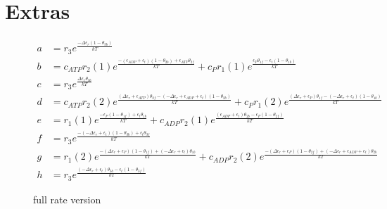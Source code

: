 \documentclass[11pt]{article}
\begin{document}
\section{Extras}
\begin{figure}[H]
    \begin{align}
        a &= r_3 e^{\frac{ - \Delta\epsilon_{r} \left( 1 - \theta_{3b} \right)}{kT}} \\
        b &= c_{ATP} r_{2}(1) e^{\frac{ - \left( {\epsilon}_{ADP} + \epsilon_{t} \right) \left( 1 - \theta_{2b} \right) + {\epsilon}_{ATP} \theta_{2f}}{kT}} + c_P r_{1}(1) e^{\frac{{\epsilon}_P \theta_{1f} - \epsilon_{t} \left( 1 - \theta_{1b} \right)}{kT}} \\
        c &= r_3 e^{\frac{\Delta\epsilon_{r} \theta_{3b}}{kT}} \\
        d &= c_{ATP} r_{2}(2) e^{\frac{\left( \Delta\epsilon_{r} + {\epsilon}_{ATP} \right) \theta_{2f} - \left(  - \Delta\epsilon_{r} + {\epsilon}_{ADP} + \epsilon_{t} \right) \left( 1 - \theta_{2b} \right)}{kT}} + c_P r_{1}(2) e^{\frac{\left( \Delta\epsilon_{r} + {\epsilon}_P \right) \theta_{1f} - \left(  - \Delta\epsilon_{r} + \epsilon_{t} \right) \left( 1 - \theta_{1b} \right)}{kT}} \\
        e &= r_{1}(1) e^{\frac{ - {\epsilon}_P \left( 1 - \theta_{1f} \right) + \epsilon_{t} \theta_{1b}}{kT}} + c_{ADP} r_{2}(1) e^{\frac{\left( {\epsilon}_{ADP} + \epsilon_{t} \right) \theta_{2b} - {\epsilon}_P \left( 1 - \theta_{2f} \right)}{kT}} \\
        f &= r_3 e^{\frac{ - \left(  - \Delta\epsilon_{r} + \epsilon_{t} \right) \left( 1 - \theta_{3b} \right) + \epsilon_{t} \theta_{3f}}{kT}} \\
        g &= r_{1}(2) e^{\frac{ - \left( \Delta\epsilon_{r} + {\epsilon}_P \right) \left( 1 - \theta_{1f} \right) + \left(  - \Delta\epsilon_{r} + \epsilon_{t} \right) \theta_{1b}}{kT}} + c_{ADP} r_{2}(2) e^{\frac{ - \left( \Delta\epsilon_{r} + {\epsilon}_P \right) \left( 1 - \theta_{2f} \right) + \left(  - \Delta\epsilon_{r} + {\epsilon}_{ADP} + \epsilon_{t} \right) \theta_{2b}}{kT}} \\
        h &= r_3 e^{\frac{\left(  - \Delta\epsilon_{r} + \epsilon_{t} \right) \theta_{3b} - \epsilon_{t} \left( 1 - \theta_{3f} \right)}{kT}}
    \end{align}
    \caption{full rate version}\label{fig:fullrates}
\end{figure}
\end{document}
